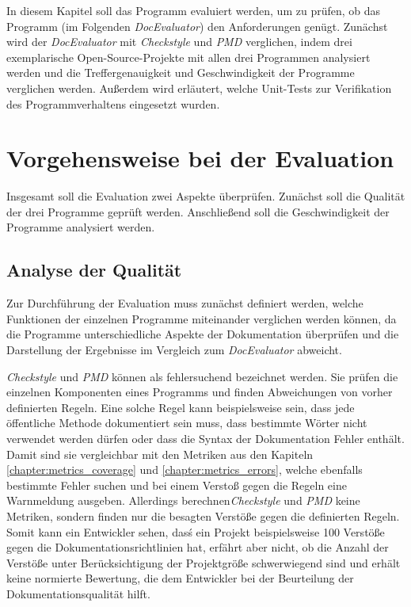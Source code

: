 \newcommand{\checkpmd}{\textit{Checkstyle} und \textit{PMD} }
\newcommand{\doceval}{\textit{DocEvaluator} }
In diesem Kapitel soll das Programm evaluiert werden, um zu prüfen, ob das Programm (im Folgenden \textit{DocEvaluator}) den Anforderungen genügt.  Zunächst wird der \textit{DocEvaluator} mit \checkpmd{} verglichen, indem drei exemplarische Open-Source-Projekte mit allen drei Programmen analysiert werden und die Treffergenauigkeit und Geschwindigkeit der Programme verglichen werden. Außerdem wird  erläutert, welche Unit-Tests zur Verifikation des Programmverhaltens eingesetzt wurden.
\section{Vorgehensweise bei der Evaluation}
Insgesamt soll die Evaluation zwei Aspekte überprüfen. Zunächst soll die Qualität der drei Programme geprüft werden. Anschließend soll die Geschwindigkeit der Programme analysiert werden.

\subsection{Analyse der Qualität}
Zur Durchführung der Evaluation muss zunächst definiert werden, welche Funktionen der einzelnen Programme miteinander verglichen werden können, da die Programme unterschiedliche Aspekte der Dokumentation überprüfen und die Darstellung der Ergebnisse im Vergleich zum \textit{DocEvaluator} abweicht.

\checkpmd können als fehlersuchend bezeichnet werden. Sie prüfen die einzelnen Komponenten eines Programms und finden Abweichungen von vorher definierten Regeln. Eine solche Regel kann beispielsweise sein, dass jede öffentliche Methode dokumentiert sein muss, dass bestimmte Wörter nicht verwendet werden dürfen oder dass die Syntax der Dokumentation Fehler enthält. Damit sind sie vergleichbar mit den Metriken aus den Kapiteln \ref{chapter:metrics_coverage}  und \ref{chapter:metrics_errors}, welche ebenfalls bestimmte Fehler suchen und bei einem Verstoß gegen die Regeln eine Warnmeldung ausgeben. Allerdings berechnen\checkpmd keine Metriken, sondern finden nur die besagten Verstöße gegen die definierten Regeln. Somit kann ein Entwickler sehen, dasś ein Projekt beispielsweise 100 Verstöße gegen die Dokumentationsrichtlinien hat, erfährt aber nicht, ob die Anzahl der Verstöße unter Berücksichtigung der Projektgröße schwerwiegend sind und erhält keine normierte Bewertung, die dem Entwickler bei der Beurteilung der Dokumentationsqualität hilft. 

